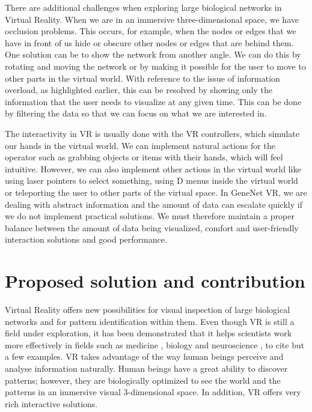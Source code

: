 There are additional challenges when exploring large biological networks in Virtual Reality. When we are in an immersive three-dimensional space, we have occlusion problems. This occurs, for example, when the nodes or edges that we have in front of us hide or obscure other nodes or edges that are behind them. One solution can be to show the network from another angle. We can do this by rotating and moving the network or by making it possible for the user to move to other parts in the virtual world. With reference to the issue of information overload, as highlighted earlier, this can be resolved by showing only the information that the user needs to visualize at any given time. This can be done by filtering the data so that we can focus on what we are interested in.

The interactivity in VR is usually done with the VR controllers, which simulate our hands in the virtual world. We can implement natural actions for the operator such as grabbing objects or items with their hands, which will feel intuitive. However, we can also implement other actions in the virtual world like using laser pointers to select something, using D menus inside the virtual world or teleporting the user to other parts of the virtual space. In GeneNet VR, we are dealing with abstract information and the amount of data can escalate quickly if we do not implement practical solutions. We must therefore maintain a proper balance between the amount of data being visualized, comfort and user-friendly interaction solutions and good performance.

\section{Proposed solution and contribution}

Virtual Reality offers new possibilities for visual inspection of large biological networks and for pattern identification within them. Even though VR is still a field under exploration, it has been demonstrated that it helps scientists work more effectively in fields such as medicine \cite{Laver11} \cite{xia_ip_samman_wong_gateno_wang_yeung_kot_tideman_2001} \cite{brain_damage_rehab}, biology \cite{bioinformatics_bti581} \cite{thorley_lawson_duca_shapiro_2008} and neuroscience \cite{bohil_alicea_biocca_2011}\cite{minderer_harvey_donato_moser_2016}, to  cite but a few examples. VR takes advantage of the way human beings perceive and analyse information naturally. Human beings have a great ability to discover patterns; however, they are biologically optimized to see the world and the patterns in an immersive visual 3-dimensional space. In addition, VR offers very rich interactive solutions.

